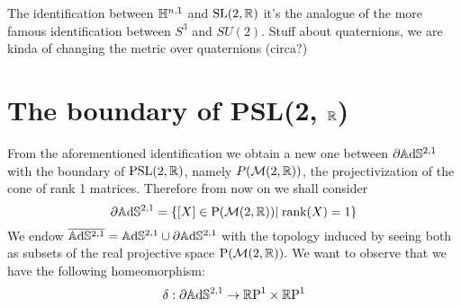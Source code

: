 \begin{observation}
    The identification between $\mathbb{H}^{n,1}$ and $\text{SL}(2,\mathbb{R})$ it's the analogue of the more famous identification between $S^3$ and $SU(2)$. Stuff about quaternions, we are kinda of changing the metric over quaternions (circa?)
\end{observation}

\section{The boundary of PSL(2, $\mathbb{R}$)} 
From the aforementioned identification we obtain a new one between $\partial\mathbb{A}\mathrm{d}\mathbb{S}^{2,1}$ with the boundary of $\text{PSL}(2,\mathbb{R})$, namely $P(\mathcal{M}(2,\mathbb{R}))$, the projectivization of the cone of rank 1 matrices. Therefore from now on we shall consider 
\[
    \partial\mathbb{A}\mathrm{d}\mathbb{S}^{2,1}=\{[X]\in\text{P}(\mathcal{M}(2,\mathbb{R}))|\;\text{rank}(X)=1\}
\]
We endow $\overline{\mathbb{A}\mathrm{d}\mathbb{S}^{2,1}}=\mathbb{A}\mathrm{d}\mathbb{S}^{2,1}\cup\partial\mathbb{A}\mathrm{d}\mathbb{S}^{2,1}$ with the topology induced by seeing both as subsets of the real projective space $\text{P}(\mathcal{M}(2,\mathbb{R})).$ We want to observe that we have the following homeomorphism: 
\[
    \delta:\partial\mathbb{A}\mathrm{d}\mathbb{S}^{2,1}\to\mathbb{R}\text{P}^1\times\mathbb{R}\text{P}^1
\] 

